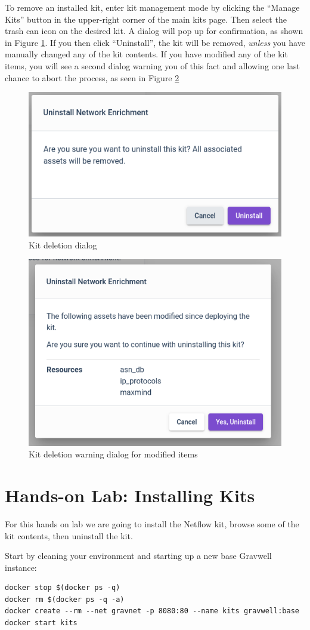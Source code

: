 To remove an installed kit, enter kit management mode by clicking the ``Manage Kits'' button in the upper-right corner of the main kits page. Then select the trash can icon on the desired kit. A dialog will pop up for confirmation, as shown in Figure \ref{fig:uninstall-confirm}. If you then click ``Uninstall'', the kit will be removed, \emph{unless} you have manually changed any of the kit contents. If you have modified any of the kit items, you will see a second dialog warning you of this fact and allowing one last chance to abort the process, as seen in Figure \ref{fig:uninstall-warn}

\begin{figure}[H]
	\includegraphics[width=0.4\linewidth]{images/uninstall-confirm.png}
	\caption{Kit deletion dialog}
	\label{fig:uninstall-confirm}
\end{figure}

\begin{figure}[H]
	\includegraphics[width=0.4\linewidth]{images/uninstall-warn.png}
	\caption{Kit deletion warning dialog for modified items}
	\label{fig:uninstall-warn}
\end{figure}

\section{Hands-on Lab: Installing Kits}

For this hands on lab we are going to install the Netflow kit, browse some of the kit contents, then uninstall the kit.

Start by cleaning your environment and starting up a new base Gravwell
instance:

\begin{Verbatim}[breaklines=true]
docker stop $(docker ps -q)
docker rm $(docker ps -q -a)
docker create --rm --net gravnet -p 8080:80 --name kits gravwell:base
docker start kits
\end{Verbatim}

